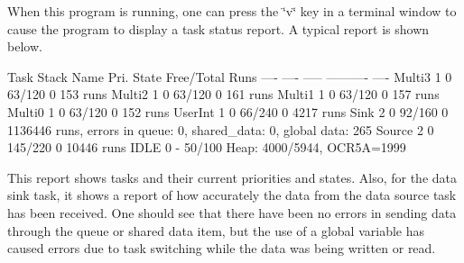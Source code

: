 \-When this program is running, one can press the \char`\"{}v\char`\"{} key in a terminal window to cause the program to display a task status report. \-A typical report is shown below. 
\begin{DoxyCode}
  Task                            Stack
  Name            Pri.    State   Free/Total      Runs
  ----            ----    -----   ----------      ----
  Multi3          1       0       63/120          0        153 runs
  Multi2          1       0       63/120          0        161 runs
  Multi1          1       0       63/120          0        157 runs
  Multi0          1       0       63/120          0        152 runs
  UserInt         1       0       66/240          0        4217 runs
  Sink            2       0       92/160          0       1136446 runs, errors 
      in queue: 0, shared_data: 0, global data: 265
  Source          2       0       145/220         0        10446 runs
  IDLE            0       -       50/100
  Heap: 4000/5944, OCR5A=1999
\end{DoxyCode}
 \-This report shows tasks and their current priorities and states. \-Also, for the data sink task, it shows a report of how accurately the data from the data source task has been received. \-One should see that there have been no errors in sending data through the queue or shared data item, but the use of a global variable has caused errors due to task switching while the data was being written or read. 